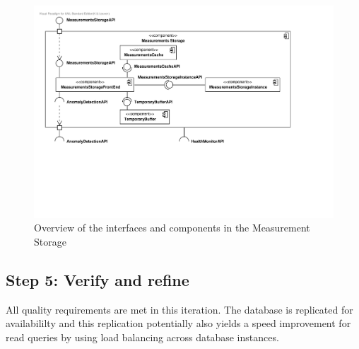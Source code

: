 \begin{figure}[H]
	\begin{centering}
		\includegraphics[width=\textwidth]{figs/add-it4-interfaces.pdf}
		\caption{Overview of the interfaces and components in the Measurement Storage}
		\label{fig:it4/interfaces}
	\end{centering}
\end{figure}

\subsection{Step 5: Verify and refine}
\label{add:it4/verification}

\npar All quality requirements are met in this iteration. The database is
replicated for availabililty and this replication potentially also yields a
speed improvement for read queries by using load balancing across database
instances.
